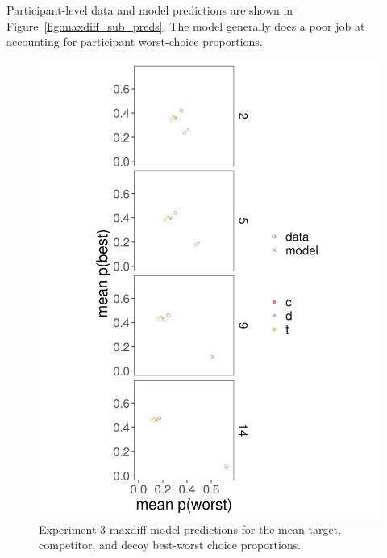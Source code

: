 Participant-level data and model predictions are shown in Figure~\ref{fig:maxdiff_sub_preds}. The model generally does a poor job at accounting for participant worst-choice proportions.
\begin{figure}
   \includegraphics[width=\linewidth]{figures/maxdiff_1_means_model_v_data.jpeg}
   \caption{Experiment 3 maxdiff model predictions for the mean target, competitor, and decoy best-worst choice proportions.}
   \label{fig:maxdiff_collapsed_preds}
\end{figure}

